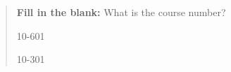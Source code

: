 \documentclass[11pt,addpoints,answers]{exam}
\begin{document}
\begin{quote}
\textbf{Fill in the blank:} What is the course number?

\begin{tcolorbox}[fit,height=1cm, width=4cm, blank, borderline={1pt}{-2pt},nobeforeafter]
    \begin{center}\huge10-601\end{center}
    \end{tcolorbox}\hspace{2cm}
    \begin{tcolorbox}[fit,height=1cm, width=4cm, blank, borderline={1pt}{-2pt},nobeforeafter]
    \begin{center}\huge10-301\end{center}
    \end{tcolorbox}
\end{quote}
\end{document}
